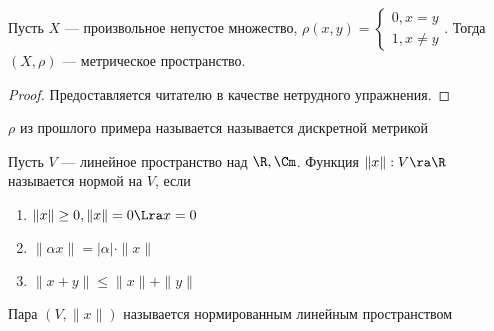 \begin{example}
    Пусть \(X\) --- произвольное непустое множество, \(\rho(x, y) = \left\{\begin{array}{l}
        0, x = y \\
        1, x \ne y
    \end{array}\right.\). Тогда \((X, \rho)\) --- метрическое пространство.
\end{example}
\begin{proof}
    Предоставляется читателю в качестве нетрудного упражнения.
\end{proof}

\begin{definition}
    \(\rho\) из прошлого примера называется называется дискретной метрикой
\end{definition}

\begin{definition}
    Пусть \(V\) --- линейное пространство над \(\R, \Cm\). Функция \(\|x\|: V \ra \R\) называется нормой на \(V\), если 
    \begin{enumerate}
        \item \(\|x\| \ge 0, \|x\| = 0 \Lra x = 0\)
        \item \(\|\alpha x\| = |\alpha|\cdot\|x\|\)
        \item \(\|x + y\| \le \|x\| + \|y\|\)
    \end{enumerate}
\end{definition}

\begin{definition}
    Пара \((V, \|x\|)\) называется нормированным линейным пространством
\end{definition}

